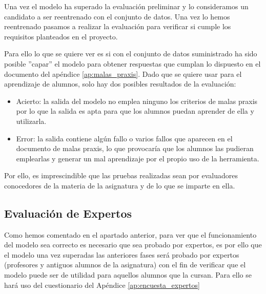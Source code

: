 Una vez el modelo ha superado la evaluación preliminar y lo consideramos un candidato a ser reentrenado con el conjunto de datos. Una vez lo hemos reentrenado pasamos a realizar la evaluación para verificar si cumple los requisitos planteados en el proyecto.

Para ello lo que se quiere ver es si con el conjunto de datos suministrado ha sido posible ''capar'' el modelo para obtener respuestas que cumplan lo dispuesto en el documento del apéndice \ref{ap:malas_praxis}. Dado que se quiere usar para el  aprendizaje de alumnos, solo hay dos posibles resultados de la evaluación:
\begin{itemize}
    \item Acierto: la salida del modelo no emplea ninguno los criterios de malas praxis por lo que la salida es apta para que los alumnos puedan aprender de ella y utilizarla.
    \item Error: la salida contiene algún fallo o varios fallos que aparecen en el documento de malas praxis, lo que provocaría que los alumnos las pudieran emplearlas y generar un mal aprendizaje por el propio uso de la herramienta.
\end{itemize}

Por ello, es imprescindible que las pruebas realizadas sean por evaluadores conocedores de la materia de la asignatura y de lo que se imparte en ella.

\subsection{Evaluación de Expertos}

Como hemos comentado en el apartado anterior, para ver que el funcionamiento del modelo sea correcto es necesario que sea probado por expertos, es por ello que el modelo una vez superadas las anteriores fases será probado por expertos (profesores y antiguos alumnos de la asignatura) con el fin de verificar que el modelo puede ser de utilidad para aquellos alumnos que la cursan. Para ello se hará uso del cuestionario del Apéndice \ref{ap:encuesta_expertos}



